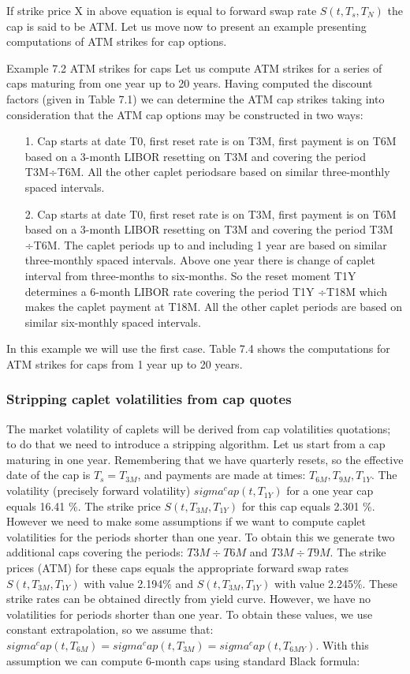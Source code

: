 \documentclass[11pt]{article}
\numberwithin{equation}{subsection}
\begin{document}
If strike price X in above equation is equal to forward swap rate \(S(t, T_s, T_N)\) the cap is
said to be ATM. Let us move now to present an example presenting computations of ATM
strikes for cap options.


Example 7.2 ATM strikes for caps
Let us compute ATM strikes for a series of caps maturing from one year up to 20
years. Having computed the discount factors (given in Table 7.1) we can determine the ATM cap strikes taking into consideration that the ATM cap options may be constructed in two ways:

\begin{enumerate}
	\item [1.] Cap starts at date T0, first reset rate is on T3M, first payment is on T6M based on a 3-month
	LIBOR resetting on T3M and covering the period T3M÷T6M. All the other caplet periodsare based on similar three-monthly spaced intervals.
	\item [2.] Cap starts at date T0, first reset rate is on T3M, first payment is on T6M based on a 3-month LIBOR resetting on T3M and covering the period T3M ÷T6M. The caplet periods up to and including 1 year are based on similar three-monthly spaced intervals. Above one year there is change of caplet interval from three-months to six-months. So the reset moment T1Y determines a 6-month LIBOR rate covering the period T1Y ÷T18M which makes the caplet payment at T18M. All the other caplet periods are based on similar six-monthly spaced intervals.
\end{enumerate}

In this example we will use the first case.
Table 7.4 shows the computations for ATM strikes for caps from 1 year up to 20 years.


\subsubsection{Stripping caplet volatilities from cap quotes}


The market volatility of caplets will be derived from cap volatilities quotations; to do that
we need to introduce a stripping algorithm.
Let us start from a cap maturing in one year. Remembering that we have quarterly resets,
so the effective date of the cap is \(T_s =T_{3M}\), and payments are made at times: \(T_{6M}, T_{9M}, T_{1Y}\).
The volatility (precisely forward volatility) \(sigma^cap(t, T_{1Y})\) for a one year cap equals 16.41 \%.
The strike price \(S(t, T_{3M}, T_{1Y})\) for this cap equals 2.301 \%. However we need to make
some assumptions if we want to compute caplet volatilities for the periods shorter than
one year. To obtain this we generate two additional caps covering the periods: \(T3M÷T6M\)
and \(T3M÷T9M\). The strike prices (ATM) for these caps equals the appropriate forward
swap rates \(S(t, T_{3M}, T_{1Y})\) with value 2.194\% and \(S(t, T_{3M}, T_{1Y})\) with value 2.245\%. These
strike rates can be obtained directly from yield curve. However, we have no volatilities for
periods shorter than one year. To obtain these values, we use constant extrapolation, so
we assume that: \(sigma^cap(t, T_{6M}) = sigma^cap(t, T_{3M}) = sigma^cap(t, T_{6MY}) \). With this assumption we can
compute 6-month caps using standard Black formula:
\end{document}
